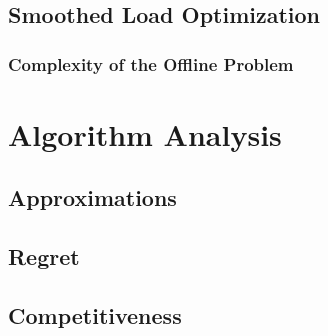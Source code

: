 \subsection{Smoothed Load Optimization}

\subsubsection{Complexity of the Offline Problem}

\section{Algorithm Analysis}

\subsection{Approximations}

\subsection{Regret}

\subsection{Competitiveness}
